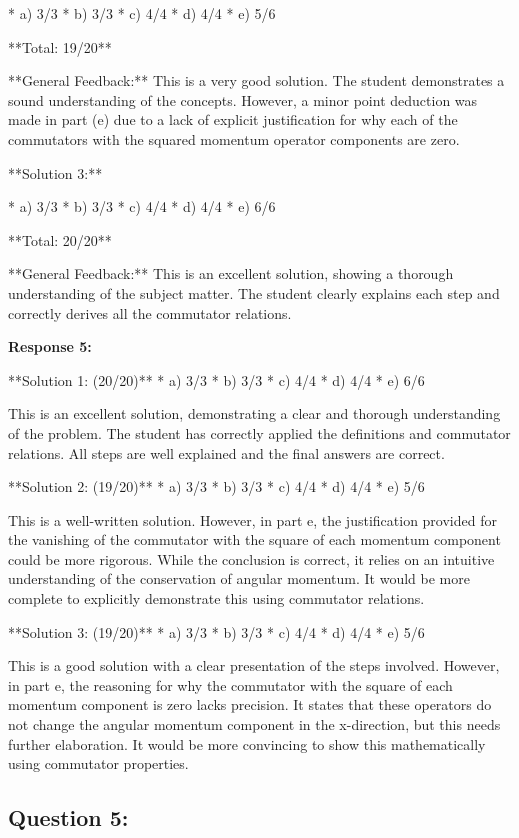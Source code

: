 \documentclass[a4paper,11pt]{article}
\begin{document}
*   a) 3/3
*   b) 3/3
*   c) 4/4
*   d) 4/4
*   e) 5/6

**Total: 19/20**

**General Feedback:** This is a very good solution. The student demonstrates a sound understanding of the concepts. However, a minor point deduction was made in part (e) due to a lack of explicit justification for why each of the commutators with the squared momentum operator components are zero.

**Solution 3:**

*   a) 3/3
*   b) 3/3
*   c) 4/4
*   d) 4/4
*   e) 6/6

**Total: 20/20**

**General Feedback:** This is an excellent solution, showing a thorough understanding of the subject matter. The student clearly explains each step and correctly derives all the commutator relations.

\bigskip    
\textbf{Response 5:}

**Solution 1: (20/20)**
*   a) 3/3
*   b) 3/3
*   c) 4/4
*   d) 4/4
*   e) 6/6

This is an excellent solution, demonstrating a clear and thorough understanding of the problem. The student has correctly applied the definitions and commutator relations. All steps are well explained and the final answers are correct.

**Solution 2: (19/20)**
*   a) 3/3
*   b) 3/3
*   c) 4/4
*   d) 4/4
*   e) 5/6

This is a well-written solution. However, in part e, the justification provided for the vanishing of the commutator with the square of each momentum component could be more rigorous. While the conclusion is correct, it relies on an intuitive understanding of the conservation of angular momentum. It would be more complete to explicitly demonstrate this using commutator relations.

**Solution 3: (19/20)**
*   a) 3/3
*   b) 3/3
*   c) 4/4
*   d) 4/4
*   e) 5/6

This is a good solution with a clear presentation of the steps involved. However, in part e, the reasoning for why the commutator with the square of each momentum component is zero lacks precision. It states that these operators do not change the angular momentum component in the x-direction, but this needs further elaboration. It would be more convincing to show this mathematically using commutator properties.

\subsection*{Question 5:}
\end{document}
